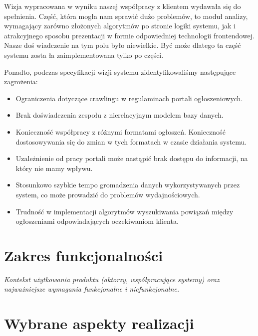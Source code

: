 \documentclass[polish,12pt]{aghthesis}
\begin{document}
Wizja wypracowana w wyniku naszej współpracy z klientem wydawała się do spełnienia.
Część, która mogła nam sprawić dużo problemów, to moduł analizy, wymagający
zarówno złożonych algorytmów po stronie logiki systemu, jak i atrakcyjnego
sposobu prezentacji w formie odpowiedniej technologii frontendowej. Nasze doś
wiadczenie na tym polu było niewielkie. Być może dlatego ta część systemu zosta
ła zaimplementowana tylko po części.

Ponadto, podczas specyfikacji wizji systemu zidentyfikowaliśmy następujące zagrożenia:
\begin{itemize}

\item Ograniczenia dotyczące crawlingu w regulaminach portali ogłoszeniowych.
\item Brak doświadczenia zespołu z nierelacyjnym modelem bazy danych.
\item Konieczność współpracy z różnymi formatami ogłoszeń. Konieczność dostosowywania się do zmian w tych formatach w czasie działania systemu.
\item Uzależnienie od pracy portali może nastąpić brak dostępu do informacji, na który nie mamy wpływu.
\item Stosunkowo szybkie tempo gromadzenia danych wykorzystywanych przez system, co może prowadzić do problemów wydajnościowych.
\item Trudność w implementacji algorytmów wyszukiwania powiązań między ogłoszeniami odpowiadających oczekiwaniom klienta.
\end{itemize}

\section{Zakres funkcjonalności}
\label{sec:zakres-funkcjonalnosci}

\emph{Kontekst użytkowania produktu (aktorzy, współpracujące systemy)
  oraz najważniejsze wymagania funkcjonalne i niefunkcjonalne.}

\section{Wybrane aspekty realizacji}
\label{sec:wybrane-aspekty-realizacji}
\end{document}
